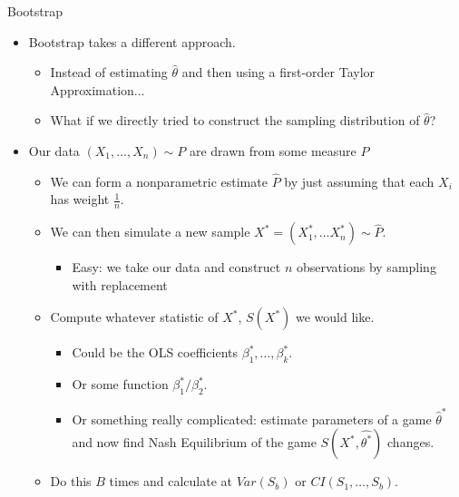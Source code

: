 \documentclass[11pt,handout,xcolor=pdftex,dvipsnames,table,mathserif,aspectratio=169]{beamer}
\begin{document}
\begin{frame}{Bootstrap}
\begin{itemize}
\item Bootstrap takes a different approach.
\begin{itemize}
\item Instead of estimating $\hat{\theta}$ and then using a first-order Taylor Approximation...
\item What if we directly tried to construct the \alert{sampling distribution} of $\hat{\theta}$?
\end{itemize}
\item Our data $(X_1,\ldots,X_n) \sim P$ are drawn from some measure $P$
\begin{itemize}
\item We can form a \alert{nonparametric estimate} $\hat{P}$ by just assuming that each $X_i$ has weight $\frac{1}{n}$.
\item We can then simulate a new sample $X^{*} = (X_1^{*},\ldots X_n^{*}) \sim \hat{P}$.
\begin{itemize}
\item Easy: we take our data and construct $n$ observations by \alert{sampling with replacement} 
\end{itemize}
\item Compute whatever statistic of $X^{*}$, $S(X^*)$ we would like.
\begin{itemize}
\item Could be the OLS coefficients $\beta_1^{*},\ldots, \beta_k^{*}$.
\item Or some function $\beta_1^{*}/\beta_2^{*}$.
\item Or something really complicated: estimate parameters of a game $\hat{\theta}^*$ and now find Nash Equilibrium of the game $S(X^{*},\hat{\theta^*})$ changes.
\end{itemize}
\item Do this $B$ times and calculate at $Var(S_b)$ or $CI(S_1,\ldots, S_b)$.
\end{itemize}
\end{itemize}
\end{frame}
\end{document}
